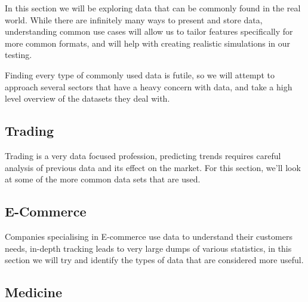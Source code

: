 In this section we will be exploring data that can be commonly found in the real world.
While there are infinitely many ways to present and store data, understanding common use cases will allow us to tailor
features specifically for more common formats, and will help with creating realistic simulations in our testing.

Finding every type of commonly used data is futile, so we will attempt to approach several sectors that have a heavy
concern with data, and take a high level overview of the datasets they deal with.

\subsection{Trading}

Trading is a very data focused profession, predicting trends requires careful analysis of previous data and its effect
on the market. 
For this section, we'll look at some of the more common data sets that are used.

\subsection{E-Commerce}

Companies specialising in E-commerce use data to understand their customers needs, in-depth tracking leads to very large
dumps of various statistics, in this section we will try and identify the types of data that are considered more useful.

\subsection{Medicine}

